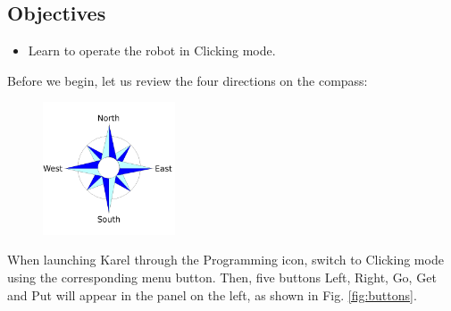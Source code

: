 \subsection{Objectives} 
\begin{itemize}
\item Learn to operate the robot in Clicking mode.
\end{itemize}
\noindent
Before we begin, let us review the four directions on the compass:\\[-7mm]

\begin{figure}[!ht]
\begin{center}
\includegraphics[width=0.35\textwidth]{imgk/compass.png}
\vspace{-0mm}
\end{center}
\vspace{-1cm}
\end{figure}

\noindent
When launching Karel through the Programming icon, switch to Clicking mode using the corresponding 
menu button. Then, five buttons Left, Right, Go, Get and Put will appear in the panel on the left,
as shown in Fig. \ref{fig:buttons}.

